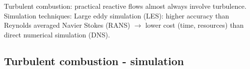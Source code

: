\documentclass{beamer}
\begin{document}
\begin{frame}
\vspace{10pt}
\scriptsize
Turbulent combustion: practical reactive flows almost always involve turbulence.
\newline \newline
Simulation techniques: Large eddy simulation (LES): higher accuracy than Reynolds averaged Navier Stokes (RANS) $\rightarrow$ lower cost (time, resources) than direct numerical simulation (DNS).


\end{frame}


\subsection[simulation]{Turbulent combustion - simulation}
\end{document}
